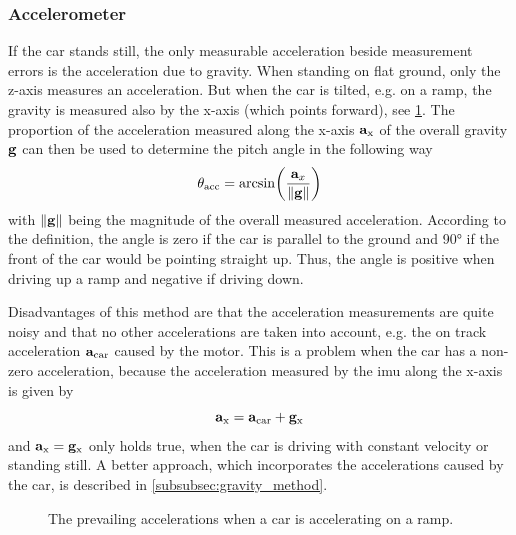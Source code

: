 \subsubsection{Accelerometer}
\label{ssec:linear_acceleration_only}
If the car stands still, the only measurable acceleration beside measurement errors is the acceleration due to gravity.
When standing on flat ground, only the z-axis measures an acceleration.
But when the car is tilted, e.g. on a ramp, the gravity is measured also by the x-axis (which points forward), see \cref{fig:tikz_car_gravity}.
The proportion of the acceleration measured along the x-axis $\vb{a}_\mathrm{x} $ of the overall gravity $\vb{g}$ can then be used to determine the pitch angle in the following way
\begin{equation}
	\label{eq:ang_from_acc}
	\theta_\mathrm{acc}  = \arcsin(\frac{\vb{a}_x}{\norm{\vb{g}}})
\end{equation}
with $\norm{\vb{g}}$ being the magnitude of the overall measured acceleration.
According to the definition, the angle is zero if the car is parallel to the ground and \ang{90} if the front of the car would be pointing straight up.
Thus, the angle is positive when driving up a ramp and negative if driving down.\par
Disadvantages of this method are that the acceleration measurements are quite noisy and that no other accelerations are taken into account, e.g. the on track acceleration $\vb{a}_\mathrm{car}$ caused by the motor.
This is a problem when the car has a non-zero acceleration, because the acceleration measured by the \gls{imu} along the x-axis is given by
\begin{equation}
	\vb{a}_\mathrm{x} = \vb{a}_\mathrm{car} + \vb{g}_\mathrm{x}
\end{equation}
and $\vb{a}_\mathrm{x} = \vb{g}_\mathrm{x} $ only holds true, when the car is driving with constant velocity or standing still.
A better approach, which incorporates the accelerations caused by the car, is described in \cref{subsubsec:gravity_method}.
\begin{figure}[htb]
	\centering
	
	\caption[Accelerations on a ramp]{The prevailing accelerations when a car is accelerating on a ramp.}
	\label{fig:tikz_car_gravity}
\end{figure}
